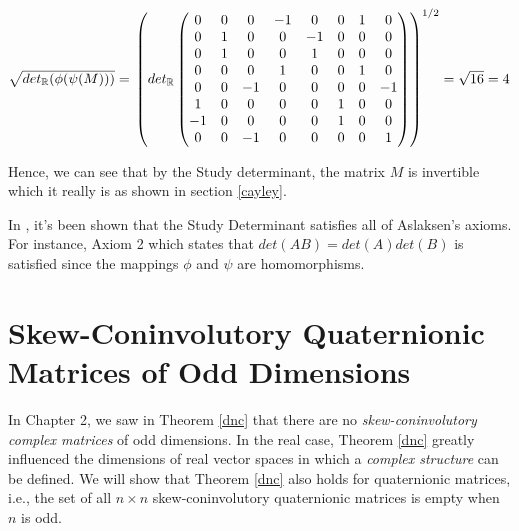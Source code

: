 \begin{ex}
\begin{enumerate}
 		$\sqrt{det_{\operatorname{\mathbb{R}}}(\phi(\psi(M)))} =$
 		$\begin{pmatrix}
 		det_{\operatorname{\mathbb{R}}}
 		\begin{pmatrix}
 			0 & 0 & 0  & -1 &  0 & 0 & 1 &  0 \\
 			0 & 1 & 0  &  0 & -1 & 0 & 0 &  0 \\
 			0 & 1 & 0  &  0 &  1 & 0 & 0 &  0 \\
 			0 & 0 & 0  &  1 &  0 & 0 & 1 &  0 \\
 			0 & 0 & -1 &  0 &  0 & 0 & 0 & -1 \\
 			1 & 0 & 0  &  0 &  0 & 1 & 0 &  0 \\
 		   -1 & 0 & 0  &  0 &  0 & 1 & 0 &  0 \\
 		    0 & 0 & -1 &  0 &  0 & 0 & 0 &  1 \\
 		\end{pmatrix}
 		\end{pmatrix}^{1/2} = \sqrt{16} = 4$
 	\end{enumerate}


\end{ex}

Hence, we can see that by the Study determinant, the matrix $M$ is invertible which it really is as shown in section \ref{cayley}. 

In \cite{aslaksen}, it's been shown that the Study Determinant satisfies all of Aslaksen's axioms. For instance, Axiom 2 which states that $det(AB)=det(A)det(B)$ is satisfied since the mappings $\phi$ and $\psi$ are homomorphisms.

\iffalse
\section{Skew-Coninvolutory Quaternionic Matrices of Odd Dimensions}
In Chapter 2, we saw in Theorem \ref{dnc} that there are no \emph{skew-coninvolutory complex matrices} of odd dimensions. In the real case, Theorem \ref{dnc} greatly influenced the dimensions of real vector spaces in which a \emph{complex structure} can be defined. We will show that Theorem \ref{dnc} also holds for quaternionic matrices, i.e., the set of all $n \times n$ skew-coninvolutory quaternionic matrices is empty when $n$ is odd.

